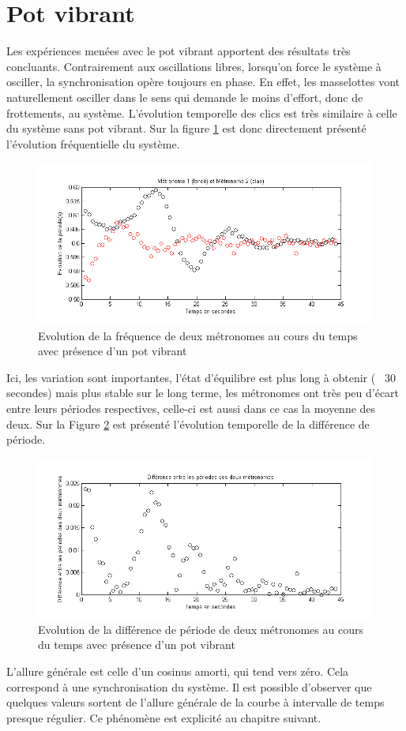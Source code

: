 \documentclass[a4paper,11pt]{report}
\begin{document}
\section{Pot vibrant}
Les expériences menées avec le pot vibrant apportent des résultats très concluants. Contrairement aux oscillations libres, lorsqu'on force le système à osciller, la synchronisation opère toujours en phase. En effet, les masselottes vont naturellement osciller dans le sens qui demande le moins d'effort, donc de frottements, au système. L'évolution temporelle des clics est très similaire à celle du système sans pot vibrant. Sur la figure \ref{SynchroFP} est donc directement présenté l'évolution fréquentielle du système.
\begin{figure}[h]
\centering
\includegraphics[width=1\textwidth]{PotVibrant_Synchro_Frequence_200BPM}
\caption{Evolution de la fréquence de deux métronomes au cours du temps avec présence d'un pot vibrant}
\label{SynchroFP}
\end{figure}
Ici, les variation sont importantes, l'état d'équilibre est plus long à obtenir (~ 30 secondes) mais plus stable sur le long terme, les métronomes ont très peu d'écart entre leurs périodes respectives, celle-ci est aussi dans ce cas la moyenne des deux. Sur la Figure \ref{SynchroPP} est présenté l'évolution temporelle de la différence de période.
\begin{figure}[!h]
\centering
\includegraphics[width=1\textwidth]{PotVibrant_Synchro_Periode_200BPM}
\caption{Evolution de la différence de période de deux métronomes au cours du temps avec présence d'un pot vibrant}
\label{SynchroPP}
\end{figure}
L'allure générale est celle d'un cosinus amorti, qui tend vers zéro. Cela correspond à une synchronisation du système. Il est possible d'observer que quelques valeurs sortent de l'allure générale de la courbe à intervalle de temps presque régulier. Ce phénomène est explicité au chapitre suivant.
\end{document}
